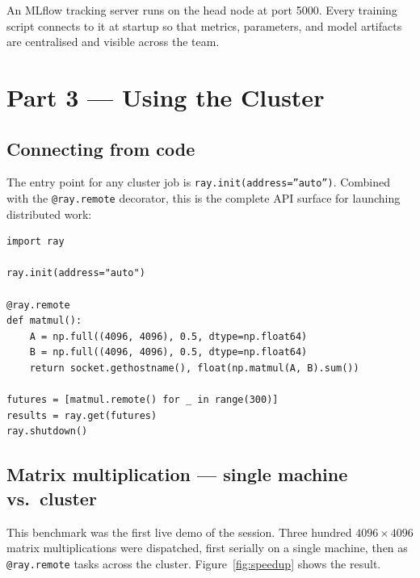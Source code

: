 \documentclass[12pt,a4paper]{article}
\begin{document}
An MLflow tracking server runs on the head node at port 5000. Every
training script connects to it at startup so that metrics, parameters,
and model artifacts are centralised and visible across the team.

\section{Part 3 --- Using the Cluster}

\subsection{Connecting from code}

The entry point for any cluster job is \texttt{ray.init(address=''auto'')}.
Combined with the \texttt{@ray.remote} decorator, this is the complete
API surface for launching distributed work:

\begin{lstlisting}[style=pycode, caption={Minimal cluster task: the pattern demonstrated in the workshop.}]
import ray

ray.init(address="auto")

@ray.remote
def matmul():
    A = np.full((4096, 4096), 0.5, dtype=np.float64)
    B = np.full((4096, 4096), 0.5, dtype=np.float64)
    return socket.gethostname(), float(np.matmul(A, B).sum())

futures = [matmul.remote() for _ in range(300)]
results = ray.get(futures)
ray.shutdown()
\end{lstlisting}

\subsection{Matrix multiplication --- single machine vs.\ cluster}

This benchmark was the first live demo of the session. Three hundred
$4096\!\times\!4096$ matrix multiplications were dispatched, first
serially on a single machine, then as \texttt{@ray.remote} tasks across
the cluster. Figure~\ref{fig:speedup} shows the result.
\end{document}
